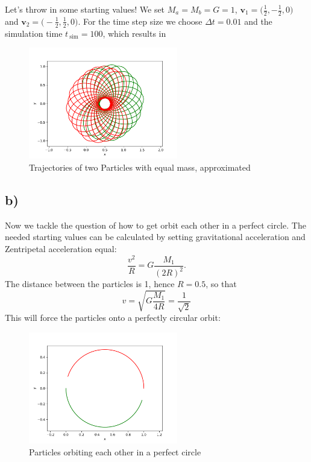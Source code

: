 \documentclass{article}
\begin{document}
 \newpage
 Let's throw in some starting values! We set \( M_a = M_b = G = 1 \),
 \( \mathbf{v} _1 = \big( \frac{1}{2} , - \frac{1}{2}, 0 \big) \) and 
 \( \mathbf{v} _2 = \big( - \frac{1}{2} ,  \frac{1}{2}, 0 \big) \). For the
 time step size we choose \( \Delta t = 0.01 \) and the simulation time 
 \( t _{\ \text{sim} } = 100 \), which results in

 \begin{figure}[ht]
     \centering
     \includegraphics[width=6.5cm]{rosette.pdf} 
     \caption{Trajectories of two Particles with equal mass, approximated} 
 \end{figure}

 \subsection*{b)}

 Now we tackle the question of how to get orbit each other in a perfect circle.
 The needed starting values can be calculated by setting gravitational
 acceleration and Zentripetal acceleration equal:
 \[ 
     \frac{v ^{2}}{R} = G \frac{M_1}{(2R)^2}.
 \]
 The distance between the particles is 1, hence \( R = 0.5 \), so that
 \[ 
     v= \sqrt{G \frac{M_1}{4R} } = \frac{1}{\sqrt{2}} 
 \]
This will force the particles onto a perfectly circular orbit:

\begin{figure}[ht]
    \centering
    \includegraphics[width=6.5cm]{kreis.pdf} 
    \caption{Particles orbiting each other in a perfect circle}  
\end{figure}
\end{document}
